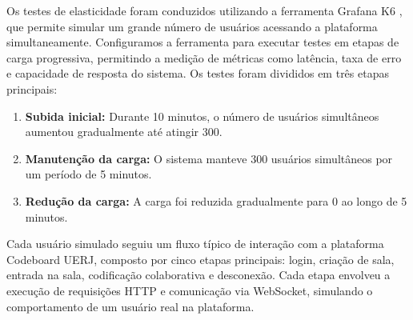 Os testes de elasticidade foram conduzidos utilizando a ferramenta Grafana K6 \cite{grafana-k6}, que permite simular um grande número de usuários acessando a plataforma simultaneamente. Configuramos a ferramenta para executar testes em etapas de carga progressiva, permitindo a medição de métricas como latência, taxa de erro e capacidade de resposta do sistema. Os testes foram divididos em três etapas principais:

\begin{enumerate}
    \item \textbf{Subida inicial:} Durante 10 minutos, o número de usuários simultâneos aumentou gradualmente até atingir 300.
    \item \textbf{Manutenção da carga:} O sistema manteve 300 usuários simultâneos por um período de 5 minutos.
    \item \textbf{Redução da carga:} A carga foi reduzida gradualmente para 0 ao longo de 5 minutos.
\end{enumerate}

Cada usuário simulado seguiu um fluxo típico de interação com a plataforma Codeboard UERJ, composto por cinco etapas principais: login, criação de sala, entrada na sala, codificação colaborativa e desconexão. Cada etapa envolveu a execução de requisições HTTP e comunicação via WebSocket, simulando o comportamento de um usuário real na plataforma.

